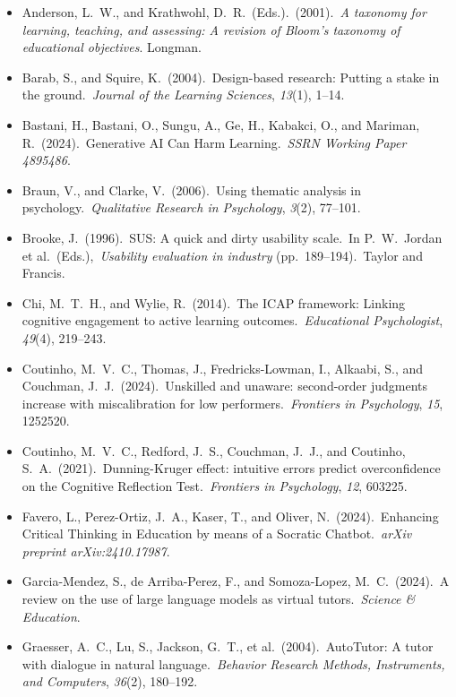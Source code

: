 \documentclass[11pt,a4paper]{article}
\begin{document}
\begin{itemize}[nosep, leftmargin=*, label={}]
    \item Anderson, L.\ W., and Krathwohl, D.\ R.\ (Eds.).\ (2001).\ \textit{A taxonomy for learning, teaching, and assessing: A revision of Bloom's taxonomy of educational objectives}. Longman.
    \item Barab, S., and Squire, K.\ (2004).\ Design-based research: Putting a stake in the ground.\ \textit{Journal of the Learning Sciences}, \textit{13}(1), 1--14.
    \item Bastani, H., Bastani, O., Sungu, A., Ge, H., Kabakci, O., and Mariman, R.\ (2024).\ Generative AI Can Harm Learning.\ \textit{SSRN Working Paper 4895486}.
    \item Braun, V., and Clarke, V.\ (2006).\ Using thematic analysis in psychology.\ \textit{Qualitative Research in Psychology}, \textit{3}(2), 77--101.
    \item Brooke, J.\ (1996).\ SUS\@: A quick and dirty usability scale.\ In P.\ W.\ Jordan et al.\ (Eds.),\ \textit{Usability evaluation in industry} (pp.\ 189--194).\ Taylor and Francis.
    \item Chi, M.\ T.\ H., and Wylie, R.\ (2014).\ The ICAP framework: Linking cognitive engagement to active learning outcomes.\ \textit{Educational Psychologist}, \textit{49}(4), 219--243.
    \item Coutinho, M.\ V.\ C., Thomas, J., Fredricks-Lowman, I., Alkaabi, S., and Couchman, J.\ J.\ (2024).\ Unskilled and unaware: second-order judgments increase with miscalibration for low performers.\ \textit{Frontiers in Psychology}, \textit{15}, 1252520.
    \item Coutinho, M.\ V.\ C., Redford, J.\ S., Couchman, J.\ J., and Coutinho, S.\ A.\ (2021).\ Dunning-Kruger effect: intuitive errors predict overconfidence on the Cognitive Reflection Test.\ \textit{Frontiers in Psychology}, \textit{12}, 603225.
    \item Favero, L., Perez-Ortiz, J.\ A., Kaser, T., and Oliver, N.\ (2024).\ Enhancing Critical Thinking in Education by means of a Socratic Chatbot.\ \textit{arXiv preprint arXiv:2410.17987}.
    \item Garcia-Mendez, S., de Arriba-Perez, F., and Somoza-Lopez, M.\ C.\ (2024).\ A review on the use of large language models as virtual tutors.\ \textit{Science \& Education}.
    \item Graesser, A.\ C., Lu, S., Jackson, G.\ T., et al.\ (2004).\ AutoTutor: A tutor with dialogue in natural language.\ \textit{Behavior Research Methods, Instruments, and Computers}, \textit{36}(2), 180--192.

\end{itemize}
\end{document}
